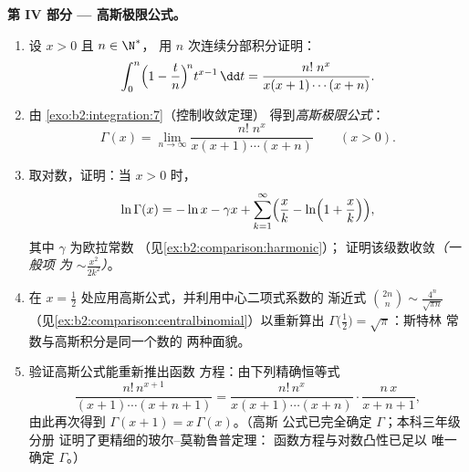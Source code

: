 \begin{problem}
\medskip
\noindent\textbf{第 IV 部分 --- 高斯极限公式。}
\begin{enumerate}[resume]
  \item 设 $x > 0$ 且 $n \in \N^*$，
        用 $n$ 次连续分部积分证明：
        \[
        \int_0^n \Bigl(1 - \frac tn\Bigr)^{\!n} t^{x-1}\,\dd t
        = \frac{n!\;n^x}{x(x+1)\cdots(x+n)} .
        \]
  \item 由 \cref{exo:b2:integration:7}（控制收敛定理）
        得到\emph{高斯极限公式}：
        \[
        \Gamma(x) = \lim_{n\to\infty}
        \frac{n!\;n^x}{x(x+1)\cdots(x+n)}
        \qquad (x > 0).
        \]
  \item 取对数，证明：当 $x > 0$ 时，
        \[
        \ln\Gamma(x) = -\ln x - \gamma x +
        \sum_{k=1}^{\infty}\Bigl(\frac xk -
        \ln\Bigl(1 + \frac xk\Bigr)\Bigr),
        \]
        其中 $\gamma$ 为欧拉常数
        （见\cref{ex:b2:comparison:harmonic}）；
        证明该级数收敛\emph{（一般项
        为 $\sim \frac{x^2}{2k^2}$）}。
  \item 在 $x = \frac12$ 处应用高斯公式，并利用中心二项式系数的
        渐近式 $\binom{2n}{n} \sim
        \frac{4^n}{\sqrt{\pi n}}$
        （见\cref{ex:b2:comparison:centralbinomial}）以重新算出
        $\Gamma\bigl(\frac12\bigr) = \sqrt\pi$：斯特林
        常数与高斯积分是同一个数的
        两种面貌。
  \item 验证高斯公式能重新推出函数
        方程：由下列精确恒等式
        \[
        \frac{n!\,n^{x+1}}{(x+1)\cdots(x+n+1)}
        = \frac{n!\,n^{x}}{x(x+1)\cdots(x+n)}\cdot
        \frac{n\,x}{x+n+1},
        \]
        由此再次得到 $\Gamma(x+1) = x\,\Gamma(x)$。（高斯
        公式已完全确定 $\Gamma$；本科三年级分册
        证明了更精细的玻尔–莫勒鲁普定理：
        函数方程与对数凸性已足以
        唯一确定 $\Gamma$。）
\end{enumerate}


\end{problem}

